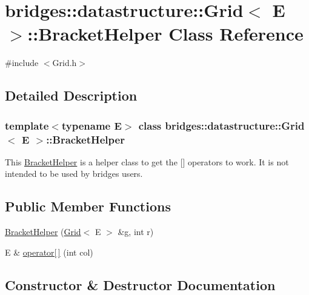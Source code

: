 \hypertarget{classbridges_1_1datastructure_1_1_grid_1_1_bracket_helper}{}\section{bridges\+:\+:datastructure\+:\+:Grid$<$ E $>$\+:\+:Bracket\+Helper Class Reference}
\label{classbridges_1_1datastructure_1_1_grid_1_1_bracket_helper}


{\ttfamily \#include $<$Grid.\+h$>$}



\subsection{Detailed Description}
\subsubsection*{template$<$typename E$>$\newline
class bridges\+::datastructure\+::\+Grid$<$ E $>$\+::\+Bracket\+Helper}

This \hyperlink{classbridges_1_1datastructure_1_1_grid_1_1_bracket_helper}{Bracket\+Helper} is a helper class to get the \mbox{[}\mbox{]} operators to work. It is not intended to be used by bridges users. \subsection*{Public Member Functions}
\begin{DoxyCompactItemize}
\item 
\hyperlink{classbridges_1_1datastructure_1_1_grid_1_1_bracket_helper_acc091a8072d7e34a21002c392d96eb1a}{Bracket\+Helper} (\hyperlink{classbridges_1_1datastructure_1_1_grid}{Grid}$<$ E $>$ \&g, int r)
\item 
E \& \hyperlink{classbridges_1_1datastructure_1_1_grid_1_1_bracket_helper_a4cf644b40ea05506e98f7f0863245ecb}{operator\mbox{[}$\,$\mbox{]}} (int col)
\end{DoxyCompactItemize}


\subsection{Constructor \& Destructor Documentation}
\mbox{\label{classbridges_1_1datastructure_1_1_grid_1_1_bracket_helper_acc091a8072d7e34a21002c392d96eb1a}} 
